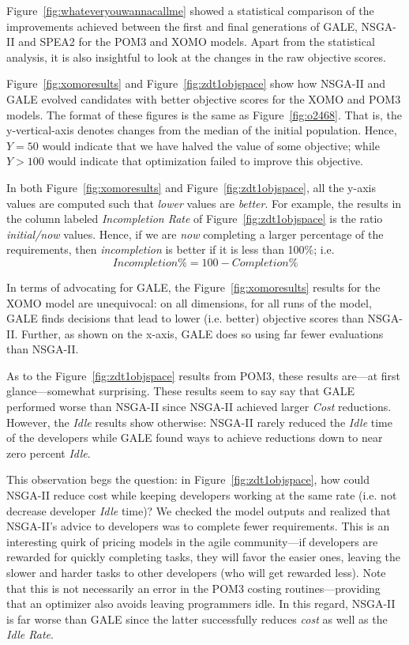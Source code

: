 \documentclass[10pt,journal,compsoc]{IEEEtran}
\newcommand{\fig}[1]{Figure~\ref{fig:#1}}
\begin{document}
\fig{whateveryouwannacallme} showed a statistical comparison of the improvements
achieved between the first and final generations
of GALE, NSGA-II and SPEA2 for the POM3 and XOMO models.
Apart from the statistical analysis, it is also insightful
to look at the changes in the raw objective scores.

\fig{xomoresults} and 
\fig{zdt1objspace} show  how NSGA-II and GALE evolved candidates
with better objective scores for the XOMO and POM3 models.
The format of these figures is the same as \fig{o2468}.
That is,
the y-vertical-axis denotes
changes from the median of the initial population.
Hence, $Y=50$ would indicate that we have halved the value of some objective;
while  $Y \gt 100$ would indicate that optimization failed to improve this objective.

In both \fig{xomoresults} and \fig{zdt1objspace}, all 
the y-axis values are computed such that {\em lower}
values are {\em better}. For example, the results in the column
labeled {\em Incompletion Rate} of \fig{zdt1objspace}
is the ratio {\em initial/now} values. Hence, if we are {\em now} completing a larger
percentage of the requirements, then {\em incompletion} is better if it is
less than 100\%; i.e. \[\mathit{Incompletion}\% = 100 - \mathit{Completion}\%\]


 
\noindent 
In terms of advocating for GALE,
the \fig{xomoresults} results for the XOMO model
are unequivocal: on all dimensions, for all runs of the model,
GALE finds decisions that lead to lower  (i.e.  better) objective scores than NSGA-II.
Further, as shown on the x-axis, GALE does so using far fewer evaluations than NSGA-II.
 

As to the \fig{zdt1objspace} results from POM3, these results are---at first glance---somewhat surprising.
These results seem to say  say that GALE
performed worse than NSGA-II since NSGA-II achieved larger
{\em Cost} reductions. However, the {\em Idle}
results  show otherwise:
 NSGA-II rarely reduced
the {\em Idle} time of the developers  while GALE
found ways to achieve reductions down to near zero percent {\em Idle}.

This observation begs the question: in \fig{zdt1objspace},
how could NSGA-II reduce cost while keeping developers working at the same rate
(i.e. not decrease developer {\em
  Idle} time)?  We checked the model outputs
and realized that  NSGA-II's advice to developers was to
complete
fewer requirements. This is an interesting quirk of pricing models in the agile
community---if developers are rewarded for quickly completing tasks, they will
favor the easier ones, leaving the slower and harder tasks to other developers (who
will get rewarded less). 
Note that this is not necessarily an error in the  POM3 costing routines---providing 
that an optimizer also avoids leaving programmers idle.
In this regard, NSGA-II is far worse than GALE since the latter
successfully reduces {\em cost} as well as the {\em Idle Rate}.
\end{document}
